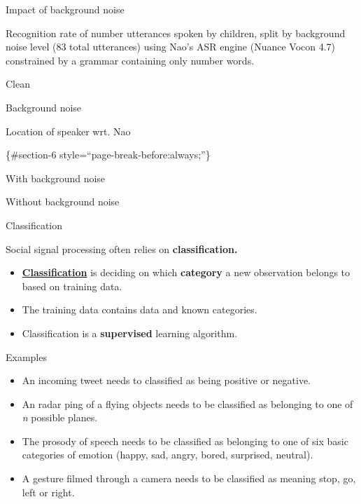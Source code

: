 \documentclass[compress]{beamer}
\providecommand{\tightlist}{%
  \setlength{\itemsep}{0pt}\setlength{\parskip}{0pt}}
\begin{document}
\begin{frame}{Impact of background noise}

Recognition rate of number utterances spoken by children, split by
background noise level (83 total utterances) using Nao's ASR engine
(Nuance Vocon 4.7) constrained by a grammar containing only number
words.

Clean

Background noise

\end{frame}

\begin{frame}{Location of speaker wrt. Nao}

\{\#section-6 style=``page-break-before:always;''\}

With background noise

Without background noise

\end{frame}

\begin{frame}{Classification}

Social signal processing often relies on \textbf{classification.}

\begin{itemize}
\tightlist
\item
  \href{https://en.wikipedia.org/wiki/Statistical_classification}{\textbf{Classification}}
  is deciding on which \textbf{category} a new observation belongs to
  based on training data.
\item
  The training data contains data and known categories.
\item
  Classification is a \textbf{supervised} learning algorithm.
\end{itemize}

Examples

\begin{itemize}
\tightlist
\item
  An incoming tweet needs to classified as being positive or negative.
\item
  An radar ping of a flying objects needs to be classified as belonging
  to one of \emph{n} possible planes.
\item
  The prosody of speech needs to be classified as belonging to one of
  six basic categories of emotion (happy, sad, angry, bored, surprised,
  neutral).
\item
  A gesture filmed through a camera needs to be classified as meaning
  stop, go, left or right.
\end{itemize}

\end{frame}
\end{document}
